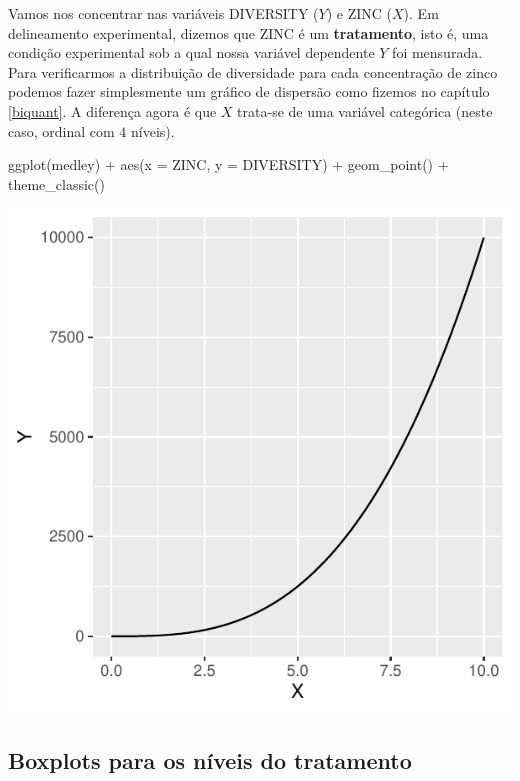 \documentclass[
]{book}
\newenvironment{Shaded}{\begin{snugshade}}{\end{snugshade}}
\newcommand{\AttributeTok}[1]{\textcolor[rgb]{0.77,0.63,0.00}{#1}}
\newcommand{\FunctionTok}[1]{\textcolor[rgb]{0.00,0.00,0.00}{#1}}
\newcommand{\NormalTok}[1]{#1}
\newcommand{\SpecialCharTok}[1]{\textcolor[rgb]{0.00,0.00,0.00}{#1}}
\begin{document}
Vamos nos concentrar nas variáveis DIVERSITY (\(Y\)) e ZINC (\(X\)). Em delineamento experimental, dizemos que ZINC é um \textbf{tratamento}, isto é, uma condição experimental sob a qual nossa variável dependente \(Y\) foi mensurada. Para verificarmos a distribuição de diversidade para cada concentração de zinco podemos fazer simplesmente um gráfico de dispersão como fizemos no capítulo \ref{biquant}. A diferença agora é que \(X\) trata-se de uma variável categórica (neste caso, ordinal com \(4\) níveis).

\begin{Shaded}
\begin{Highlighting}[]
\FunctionTok{ggplot}\NormalTok{(medley) }\SpecialCharTok{+}
  \FunctionTok{aes}\NormalTok{(}\AttributeTok{x =}\NormalTok{ ZINC, }\AttributeTok{y =}\NormalTok{ DIVERSITY) }\SpecialCharTok{+}
  \FunctionTok{geom\_point}\NormalTok{() }\SpecialCharTok{+}
  \FunctionTok{theme\_classic}\NormalTok{()}
\end{Highlighting}
\end{Shaded}

\includegraphics{probest-cambientais_files/figure-latex/unnamed-chunk-214-1.pdf}

\hypertarget{boxplots-para-os-nuxedveis-do-tratamento}{%
\subsection{Boxplots para os níveis do tratamento}\label{boxplots-para-os-nuxedveis-do-tratamento}}
\end{document}

